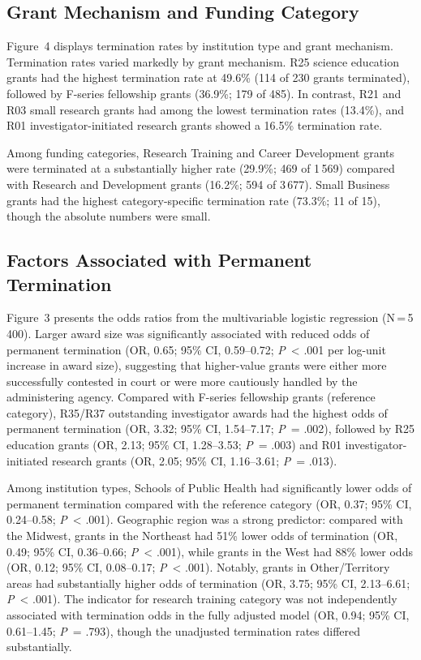 \documentclass[10pt, letterpaper]{article}
\begin{document}
\subsection*{Grant Mechanism and Funding Category}

Figure~4 displays termination rates by institution type and grant mechanism. Termination rates varied markedly by grant mechanism. R25 science education grants had the highest termination rate at 49.6\% (114 of 230 grants terminated), followed by F-series fellowship grants (36.9\%; 179 of 485). In contrast, R21 and R03 small research grants had among the lowest termination rates (13.4\%), and R01 investigator-initiated research grants showed a 16.5\% termination rate.

Among funding categories, Research Training and Career Development grants were terminated at a substantially higher rate (29.9\%; 469 of 1\,569) compared with Research and Development grants (16.2\%; 594 of 3\,677). Small Business grants had the highest category-specific termination rate (73.3\%; 11 of 15), though the absolute numbers were small.

\subsection*{Factors Associated with Permanent Termination}

Figure~3 presents the odds ratios from the multivariable logistic regression (N\,=\,5\,400). Larger award size was significantly associated with reduced odds of permanent termination (OR, 0.65; 95\% CI, 0.59--0.72; \textit{P}~< .001 per log-unit increase in award size), suggesting that higher-value grants were either more successfully contested in court or were more cautiously handled by the administering agency. Compared with F-series fellowship grants (reference category), R35/R37 outstanding investigator awards had the highest odds of permanent termination (OR, 3.32; 95\% CI, 1.54--7.17; \textit{P}~= .002), followed by R25 education grants (OR, 2.13; 95\% CI, 1.28--3.53; \textit{P}~= .003) and R01 investigator-initiated research grants (OR, 2.05; 95\% CI, 1.16--3.61; \textit{P}~= .013).

Among institution types, Schools of Public Health had significantly lower odds of permanent termination compared with the reference category (OR, 0.37; 95\% CI, 0.24--0.58; \textit{P}~< .001). Geographic region was a strong predictor: compared with the Midwest, grants in the Northeast had 51\% lower odds of termination (OR, 0.49; 95\% CI, 0.36--0.66; \textit{P}~< .001), while grants in the West had 88\% lower odds (OR, 0.12; 95\% CI, 0.08--0.17; \textit{P}~< .001). Notably, grants in Other/Territory areas had substantially higher odds of termination (OR, 3.75; 95\% CI, 2.13--6.61; \textit{P}~< .001). The indicator for research training category was not independently associated with termination odds in the fully adjusted model (OR, 0.94; 95\% CI, 0.61--1.45; \textit{P}~= .793), though the unadjusted termination rates differed substantially.
\end{document}
